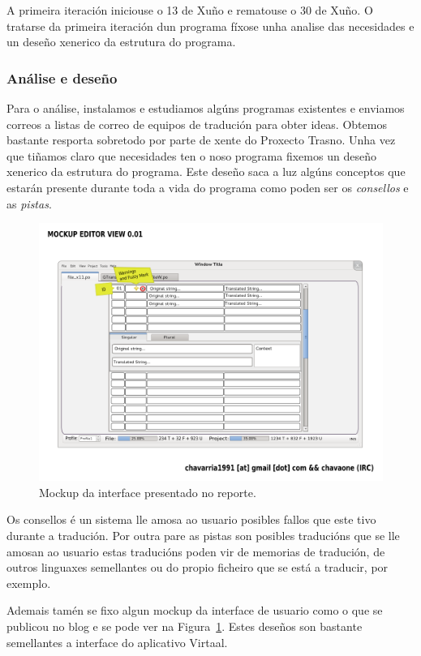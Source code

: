 A primeira iteración iniciouse o 13 de Xuño e rematouse o 30 de Xuño. O tratarse da primeira iteración dun programa fíxose unha analise das necesidades e un deseño xenerico da estrutura do programa.

\subsubsection{Análise e deseño}
Para o análise, instalamos e estudiamos algúns programas existentes e enviamos correos a listas de correo de equipos de tradución para obter ideas. Obtemos bastante resporta sobretodo por parte de xente do Proxecto Trasno. Unha vez que tiñamos claro que necesidades ten o noso programa fixemos un deseño xenerico da estrutura do programa. Este deseño saca a luz algúns conceptos que estarán presente durante toda a vida do programa como poden ser os \emph{consellos} e as \emph{pistas}.

\begin{figure}[h]
    \centering
    \includegraphics[width=\textwidth]{img/mockup_interface1.png}
    \caption{Mockup da interface presentado no reporte.}
    \label{fig:mockup_int1}
\end{figure}

Os consellos é un sistema lle amosa ao usuario posibles fallos que este tivo durante a tradución. Por outra pare as pistas son posibles traducións que se lle amosan ao usuario estas traducións poden vir de memorias de tradución, de outros linguaxes semellantes ou do propio ficheiro que se está a traducir, por exemplo.

Ademais tamén se fixo algun mockup da interface de usuario como o que se publicou no blog e se pode ver na Figura~\ref{fig:mockup_int1}. Estes deseños son bastante semellantes a interface do aplicativo Virtaal.

